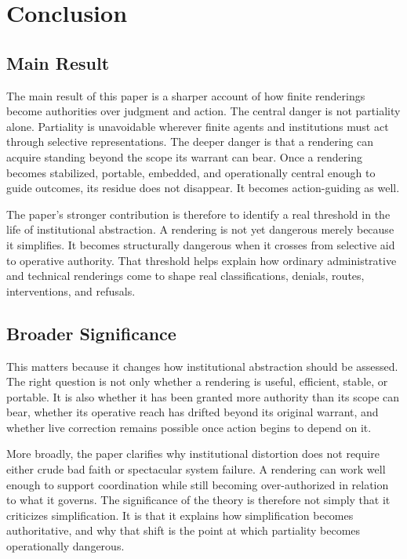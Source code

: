 \documentclass[11pt]{article}
\begin{document}
\section{Conclusion}

\subsection{Main Result}

The main result of this paper is a sharper account of how finite renderings become authorities over judgment and action. The central danger is not partiality alone. Partiality is unavoidable wherever finite agents and institutions must act through selective representations. The deeper danger is that a rendering can acquire standing beyond the scope its warrant can bear. Once a rendering becomes stabilized, portable, embedded, and operationally central enough to guide outcomes, its residue does not disappear. It becomes action-guiding as well.

The paper's stronger contribution is therefore to identify a real threshold in the life of institutional abstraction. A rendering is not yet dangerous merely because it simplifies. It becomes structurally dangerous when it crosses from selective aid to operative authority. That threshold helps explain how ordinary administrative and technical renderings come to shape real classifications, denials, routes, interventions, and refusals.

\subsection{Broader Significance}

This matters because it changes how institutional abstraction should be assessed. The right question is not only whether a rendering is useful, efficient, stable, or portable. It is also whether it has been granted more authority than its scope can bear, whether its operative reach has drifted beyond its original warrant, and whether live correction remains possible once action begins to depend on it.

More broadly, the paper clarifies why institutional distortion does not require either crude bad faith or spectacular system failure. A rendering can work well enough to support coordination while still becoming over-authorized in relation to what it governs. The significance of the theory is therefore not simply that it criticizes simplification. It is that it explains how simplification becomes authoritative, and why that shift is the point at which partiality becomes operationally dangerous.
\end{document}
